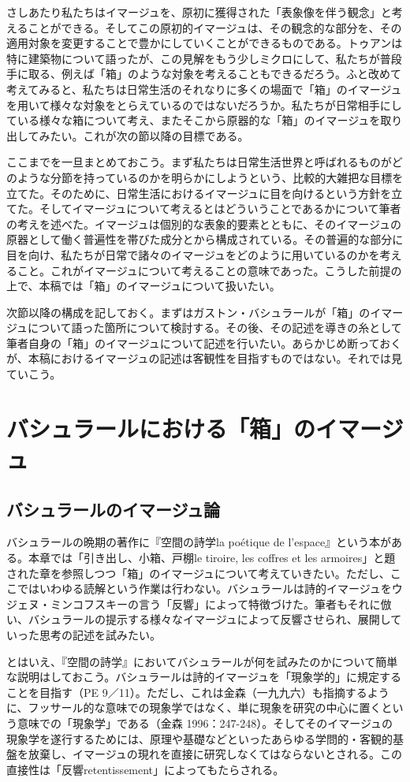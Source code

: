 \documentclass[b5j,twoside,twocolumn]{utarticle}
\begin{document}
さしあたり私たちはイマージュを、原初に獲得された「表象像を伴う観念」と考えることができる。そしてこの原初的イマージュは、その観念的な部分を、その適用対象を変更することで豊かにしていくことができるものである。トゥアンは特に建築物について語ったが、この見解をもう少しミクロにして、私たちが普段手に取る、例えば「箱」のような対象を考えることもできるだろう。ふと改めて考えてみると、私たちは日常生活のそれなりに多くの場面で「箱」のイマージュを用いて様々な対象をとらえているのではないだろうか。私たちが日常相手にしている様々な箱について考え、またそこから原器的な「箱」のイマージュを取り出してみたい。これが次の節以降の目標である。


ここまでを一旦まとめておこう。まず私たちは日常生活世界と呼ばれるものがどのような分節を持っているのかを明らかにしようという、比較的大雑把な目標を立てた。そのために、日常生活におけるイマージュに目を向けるという方針を立てた。そしてイマージュについて考えるとはどういうことであるかについて筆者の考えを述べた。イマージュは個別的な表象的要素とともに、そのイマージュの原器として働く普遍性を帯びた成分とから構成されている。その普遍的な部分に目を向け、私たちが日常で諸々のイマージュをどのように用いているのかを考えること。これがイマージュについて考えることの意味であった。こうした前提の上で、本稿では「箱」のイマージュについて扱いたい。


次節以降の構成を記しておく。まずはガストン・バシュラールが「箱」のイマージュについて語った箇所について検討する。その後、その記述を導きの糸として筆者自身の「箱」のイマージュについて記述を行いたい。あらかじめ断っておくが、本稿におけるイマージュの記述は客観性を目指すものではない。それでは見ていこう。

\section{バシュラールにおける「箱」のイマージュ}
\subsection{バシュラールのイマージュ論}
バシュラールの晩期の著作に『空間の詩学la poétique de l'espace』という本がある。本章では「引き出し、小箱、戸棚le tiroire, les coffres et les armoires」と題された章を参照しつつ「箱」のイマージュについて考えていきたい。ただし、ここではいわゆる読解という作業は行わない。バシュラールは詩的イマージュをウジェヌ・ミンコフスキーの言う「反響」によって特徴づけた。筆者もそれに倣い、バシュラールの提示する様々なイマージュによって反響させられ、展開していった思考の記述を試みたい。


とはいえ、『空間の詩学』においてバシュラールが何を試みたのかについて簡単な説明はしておこう。バシュラールは詩的イマージュを「現象学的」に規定することを目指す（PE 9／11）。ただし、これは金森（一九九六）も指摘するように、フッサール的な意味での現象学ではなく、単に現象を研究の中心に置くという意味での「現象学」である（金森 1996：247-248）。そしてそのイマージュの現象学を遂行するためには、原理や基礎などといったあらゆる学問的・客観的基盤を放棄し、イマージュの現れを直接に研究しなくてはならないとされる。この直接性は「反響retentissement」によってもたらされる。
\end{document}
